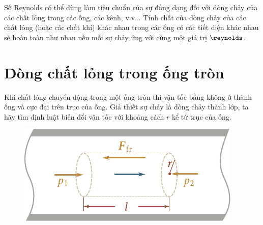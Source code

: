 
Số Reynolds có thể dùng làm tiêu chuẩn của sự đồng dạng đối với dòng chảy của các chất lỏng trong các ống, các kênh, v.v... Tính chất của dòng chảy của các chất lỏng (hoặc các chất khí) khác nhau trong các ống có các tiết diện khác nhau sẽ hoàn toàn như nhau nếu mỗi sự chảy ứng với cùng một giá trị $\reynolds$.


\section{Dòng chất lỏng trong ống tròn}\label{sec:9_6}


Khi chất lỏng chuyển động trong một ống tròn thì vận tốc bằng không ở thành ống và cực đại trên trục của ống. Giả thiết sự chảy là dòng chảy thành lớp, ta hãy tìm định luật biến đổi vận tốc với khoảng cách $r$ kể từ trục của ống. 

\begin{figure}[!htb]
	\begin{center}
		\includegraphics[scale=1.0]{figures/ch_09/fig_9_10.pdf}
		\caption[]{}
		\label{fig:9_10}
	\end{center}
	\vspace{-0.8cm}
\end{figure}

